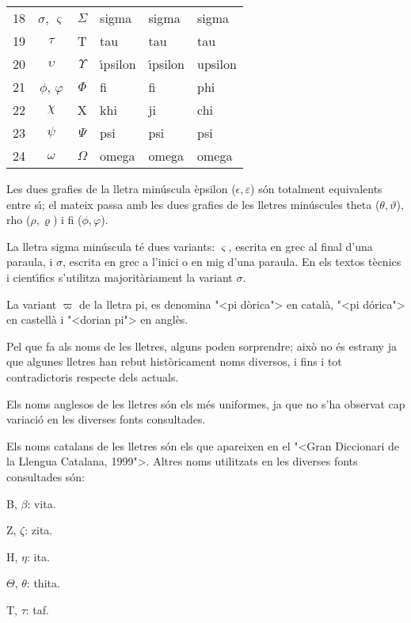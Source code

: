 \begin{table}[h]
\begin{center}
\begin{tabular}{ccclll}
   18 & $\sigma$, $\varsigma$ & $\Sigma$ & sigma & sigma &  sigma\\
   19 & $\tau$ & T & tau & tau & tau\\
   20 & $\upsilon$ & $\Upsilon$ & \'{\i}psilon & \'{\i}psilon &  upsilon\\
   21 & $\phi$, $\varphi$ & $\Phi$ & fi & fi &  phi\\
   22 & $\chi$ & X & khi & ji &  chi\\
   23 & $\psi$ & $\Psi$ & psi & psi &  psi\\
   24 & $\omega$ & $\Omega$ & omega & omega &  omega\\
   \bottomrule[1pt]
   \end{tabular} \end{center}
\end{table}

Les dues grafies de la lletra min\'{u}scula \`{e}psilon  ($\epsilon,
\varepsilon$) s\'{o}n totalment equivalents entre s\'{\i}; el mateix passa
amb les dues grafies de les lletres min\'{u}scules theta ($\theta,
\vartheta$), rho ($\rho,\varrho$) i fi ($\phi, \varphi$).

La lletra sigma min\'{u}scula t\'{e} dues variants: $\varsigma$, escrita en
grec al final d'una paraula, i $\sigma$, escrita en grec a l'inici o
en mig d'una paraula. En els textos t\`{e}cnics i cient\'{\i}fics s'utilitza
majorit\`{a}riament la variant $\sigma$.

La variant $\varpi$ de la lletra pi, es denomina {"<}pi d\`{o}rica{">} en
catal\`{a}, {"<}pi d\'{o}rica{">} en castell\`{a} i {"<}dorian pi{">} en angl\`{e}s.

Pel que fa als noms de les lletres, alguns poden sorprendre; aix\`{o} no
\'{e}s estrany ja que algunes lletres han rebut hist\`{o}ricament noms
diversos, i fins i tot contradictoris respecte dels actuals.

Els noms anglesos de les lletres s\'{o}n els m\'{e}s uniformes, ja que no
s'ha observat cap variaci\'{o} en les diverses fonts consultades.

Els noms catalans de les lletres s\'{o}n els que apareixen en el {"<}Gran
Diccionari de la Llengua Catalana, 1999{">}. Altres noms utilitzats en
les diverses fonts consultades s\'{o}n:
\begin{multicols}{3}
\begin{list}{}
   {\setlength{\labelwidth}{16mm} \setlength{\leftmargin}{16mm} \setlength{\labelsep}{2mm}}
   \item[B, $\beta$:] vita.
   \item[Z, $\zeta$:] zita.
   \item[H, $\eta$:] ita.
   \item[$\Theta$, $\theta$:] thita.
   \item[T, $\tau$:] taf.
\end{list}
\end{multicols}

